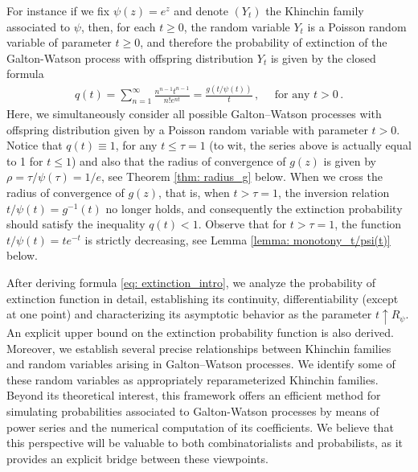 \documentclass[11pt,a4paper,leqno]{amsart}
\theoremstyle{plain}
\theoremstyle{definition}
\numberwithin{equation}{section}
\begin{document}
	
	For instance if we fix $\psi(z) = e^z$ and denote $(Y_t)$ the Khinchin family associated to $\psi$, then, for each $t\geq 0$, the random variable $Y_t$ is a Poisson random variable of parameter $t \geq 0$, and therefore the probability of extinction of the Galton-Watson process with offspring distribution $Y_t$ is given by the closed formula
	\begin{align*}
	q(t) = \sum_{n = 1}^{\infty}\frac{n^{n-1}t^{n-1}}{n!e^{nt}} = \frac{g(t/\psi(t))}{t}\,, \quad \text{ for any } t > 0\,.
	\end{align*}
Here, we simultaneously consider all possible Galton–Watson processes with offspring distribution given by a Poisson random variable with parameter \( t > 0 \). Notice that $q(t) \equiv 1$, for any $t \leq \tau = 1$ (to wit, the series above is actually equal to 1 for $t \leq 1$) and also that the radius of convergence of $g(z)$ is given by $\rho = \tau/\psi(\tau) = 1/e$, see Theorem \ref{thm: radius_g} below. When we cross the radius of convergence of $g(z)$, that is, when $t>\tau = 1$, the inversion relation \( {t}/{\psi(t)} = g^{-1}(t) \) no longer holds, and consequently the extinction probability should satisfy the inequality \( q(t) < 1 \). Observe that for $t> \tau = 1$, the function $t/\psi(t) = te^{-t}$ is strictly decreasing, see Lemma \ref{lemma: monotony_t/psi(t)} below.
	\smallskip
	
	After deriving formula \eqref{eq: extinction_intro}, we analyze the probability of extinction function in detail, establishing its continuity, differentiability (except at one point) and characterizing its asymptotic behavior as  the parameter \(t\uparrow R_{\psi}\). An explicit upper bound on the extinction probability function is also derived. Moreover, we establish several precise relationships between Khinchin families and random variables arising in Galton–Watson processes. We identify some of these random variables as appropriately reparameterized Khinchin families. Beyond its theoretical interest, this framework offers an efficient method for simulating probabilities associated to Galton-Watson processes by means of power series and the numerical computation of its coefficients. 
	We believe that this perspective will be valuable to both combinatorialists and probabilists, as it provides an explicit bridge between these viewpoints.
	


\medskip
	
\end{document}

